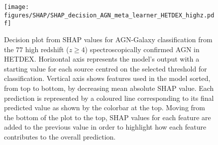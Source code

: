 \documentclass{aa}
\begin{document}
\begin{figure}[t]
    \centering
    \begin{minipage}{0.75\columnwidth}
    \texttt{[image: figures/SHAP/SHAP\_decision\_AGN\_meta\_learner\_HETDEX\_highz.pdf]}
    \end{minipage}%
    \caption{Decision plot from SHAP values for AGN-Galaxy classification from the $77$ high redshift ($z \geq 4$) spectroscopically confirmed AGN in HETDEX. Horizontal axis represents the model's output with a starting value for each source centred on the selected threshold for classification. Vertical axis shows features used in the model sorted, from top to bottom, by decreasing mean absolute SHAP value. Each prediction is represented by a coloured line corresponding to its final predicted value as shown by the colorbar at the top. Moving from the bottom of the plot to the top, SHAP values for each feature are added to the previous value in order to highlight how each feature contributes to the overall prediction.}
   \label{fig:SHAP_decision_AGN_meta_HETDEX_high_z}
\end{figure}
\end{document}
